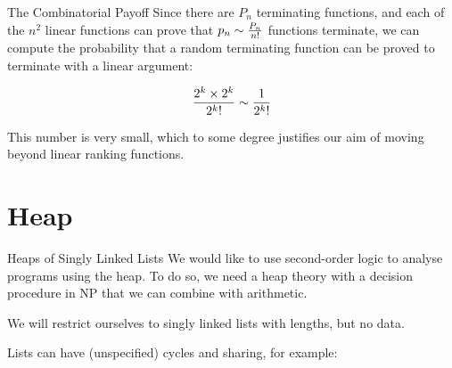 \documentclass[xcolor=pdftex,t,11pt]{beamer}
\begin{document}
\begin{frame}{The Combinatorial Payoff}
Since there are $P_n$ terminating functions, and each of the $n^2$ linear functions can prove that
$p_n \sim {P_n \over n!}$ functions terminate, we can compute the probability that a random terminating
function can be proved to terminate with a linear argument:

$${2^k \times 2^k \over {2^k}!} \sim {1 \over {2^k}!}$$

\pause

\vspace{1em}

This number is very small, which to some degree justifies our aim of moving beyond linear ranking functions.

\end{frame}

\section{Heap}

\begin{frame}[fragile]{Heaps of Singly Linked Lists}
We would like to use second-order logic to analyse programs using the heap.  To do so, we need a
heap theory with a decision procedure in NP that we can combine with arithmetic.

\pause

We will restrict ourselves to singly linked lists with lengths, but no data.


\pause 

Lists can have (unspecified) cycles and sharing, for example:

\begin{center}
\end{center}
\end{frame}
\end{document}
